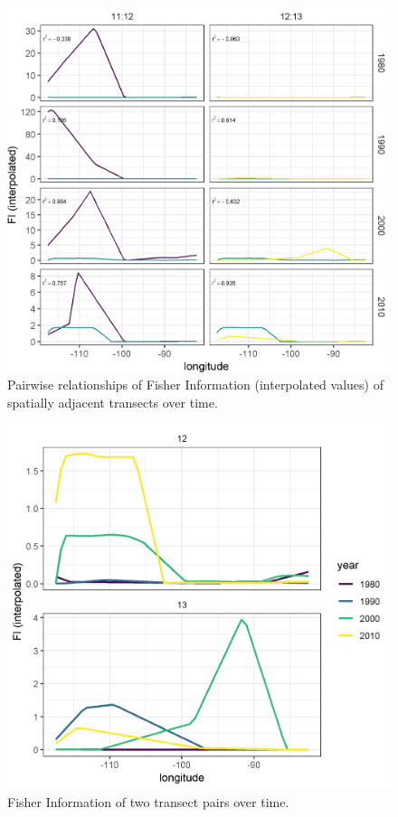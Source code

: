 \documentclass[12pt,twoside,openany]{reedthesis}
\begin{document}
\begin{figure}
\includegraphics[width=0.85\linewidth]{./chapterFiles/fisherSpatial/figures/figsCalledInDiss/interpolated_FI_corplotSelectTransects_East-West} \caption{Pairwise relationships of Fisher Information (interpolated values) of spatially adjacent transects over time. }\label{fig:corPlotTsectsInterp}
\end{figure}
\begin{figure}
\includegraphics[width=0.85\linewidth]{./chapterFiles/fisherSpatial/figures/figsCalledInDiss/interp_FI_singlePair_corPlot_East-West} \caption{Fisher Information of two transect pairs over time. }\label{fig:fiSinglePair}
\end{figure}
\end{document}
